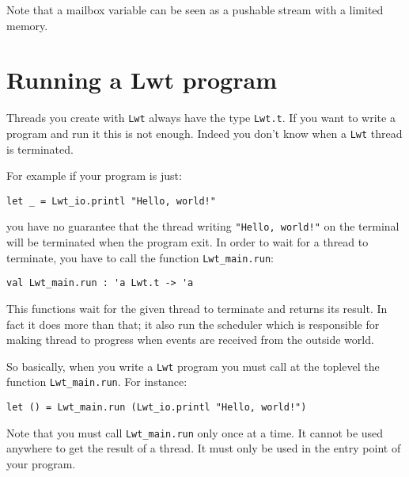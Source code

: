 Note that a mailbox variable can be seen as a pushable stream with a
limited memory.



\section{ Running a Lwt program }

Threads you create with {\tt Lwt} always have the type
{\tt Lwt.t}. If you want to write a program and run it this is not
enough. Indeed you don't know when a {\tt Lwt} thread is terminated.



For example if your program is just:



\lstset{language=[Objective]Caml}\begin{lstlisting}
let _ = Lwt_io.printl "Hello, world!"
\end{lstlisting}
\medskip

\noindent
you have no guarantee that the thread writing {\tt "Hello, world!"}
on the terminal will be terminated when the program exit. In order
to wait for a thread to terminate, you have to call the function
{\tt Lwt\_main.run}:



\lstset{language=[Objective]Caml}\begin{lstlisting}
val Lwt_main.run : 'a Lwt.t -> 'a
\end{lstlisting}
\medskip

\noindent
This functions wait for the given thread to terminate and returns
its result. In fact it does more than that; it also run the
scheduler which is responsible for making thread to progress when
events are received from the outside world.



So basically, when you write a {\tt Lwt} program you must call at
the toplevel the function {\tt Lwt\_main.run}. For instance:



\lstset{language=[Objective]Caml}\begin{lstlisting}
let () = Lwt_main.run (Lwt_io.printl "Hello, world!")
\end{lstlisting}
\medskip

\noindent
Note that you must call {\tt Lwt\_main.run} only once at a time. It
cannot be used anywhere to get the result of a thread. It must only
be used in the entry point of your program.




